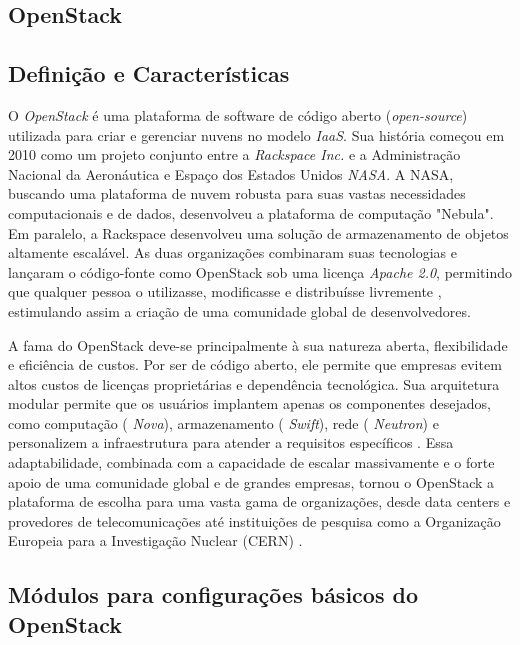 \begin{itemize}
\section{OpenStack}

\subsection{Definição e Características}

O  \textit{OpenStack} é uma plataforma de software de código aberto (\textit{open-source}) utilizada para criar e gerenciar nuvens no modelo \textit{IaaS}. Sua história começou em 2010 como um projeto conjunto entre a  \textit{Rackspace Inc.} e a Administração Nacional da Aeronáutica e Espaço dos Estados Unidos \textit{NASA}. A NASA, buscando uma plataforma de nuvem robusta para suas vastas necessidades computacionais e de dados, desenvolveu a plataforma de computação "Nebula". Em paralelo, a Rackspace desenvolveu uma solução de armazenamento de objetos altamente escalável. As duas organizações combinaram suas tecnologias e lançaram o código-fonte como OpenStack sob uma licença  \textit{Apache 2.0}, permitindo que qualquer pessoa o utilizasse, modificasse e distribuísse livremente \cite{nasa2012}, estimulando assim a criação de uma comunidade global de desenvolvedores.

A fama do OpenStack deve-se principalmente à sua natureza aberta, flexibilidade e eficiência de custos. Por ser de código aberto, ele permite que empresas evitem altos custos de licenças proprietárias e dependência tecnológica. Sua arquitetura modular permite que os usuários implantem apenas os componentes desejados, como computação ( \textit{Nova}), armazenamento ( \textit{Swift}), rede ( \textit{Neutron}) e personalizem a infraestrutura para atender a requisitos específicos \cite{grzonka2015}. Essa adaptabilidade, combinada com a capacidade de escalar massivamente e o forte apoio de uma comunidade global e de grandes empresas, tornou o OpenStack a plataforma de escolha para uma vasta gama de organizações, desde data centers e provedores de telecomunicações até instituições de pesquisa como a Organização Europeia para a Investigação Nuclear (CERN) \cite{rousseau2019}.

\subsection{Módulos para configurações básicos do OpenStack}


\end{itemize}
